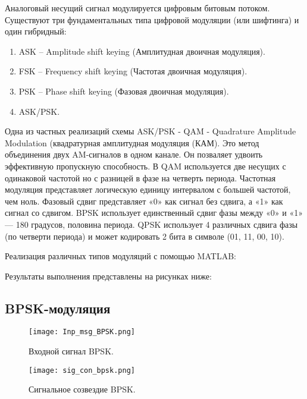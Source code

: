 Аналоговый несущий сигнал модулируется цифровым битовым потоком.
Существуют три фундаментальных типа цифровой модуляции (или шифтинга) и один гибридный:
\begin{enumerate}
\item ASK – Amplitude shift keying (Амплитудная двоичная модуляция).
\item FSK – Frequency shift keying (Частотая двоичная модуляция).
\item PSK – Phase shift keying (Фазовая двоичная модуляция).
\item ASK/PSK.
\end{enumerate}
Одна из частных реализаций схемы ASK/PSK - QAM - Quadrature Amplitude Modulation (квадратурная амплитудная модуляция (КАМ). Это метод объединения двух AM-сигналов в одном канале. Он позваляет удвоить эффективную пропускную способность. В QAM используется две несущих с одинаковой частотой но с разницей в фазе на четверть периода.
Частотная модуляция представляет логическую единицу интервалом с большей частотой, чем ноль.
Фазовый сдвиг представляет «0» как сигнал без сдвига, а «1» как сигнал со сдвигом.
BPSK использует единственный сдвиг фазы между «0» и «1» — 180 градусов, половина периода.
QPSK использует 4 различных сдвига фазы (по четверти периода) и может кодировать 2 бита в символе (01, 11, 00, 10).
 
Реализация различных типов модуляций с помощью MATLAB:



Результаты выполнения представлены на рисунках ниже:

\subsection{BPSK-модуляция}
 
\begin{figure}[H]
	\begin{center}
		\texttt{[image: Inp\_msg\_BPSK.png]}
		\caption{Входной сигнал BPSK.} %
		\label{Inp_msg_BPSK} %
	\end{center}
\end{figure}

\begin{figure}[H]
	\begin{center}
		\texttt{[image: sig\_con\_bpsk.png]}
		\caption{Сигнальное созвездие BPSK.} %
		\label{sig_con_bpsk} %
	\end{center}
\end{figure}


